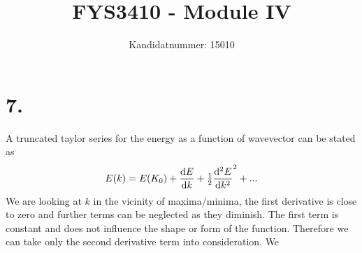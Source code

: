 \documentclass{article}
\author{Kandidatnummer: 15010}
\title{FYS3410 - Module IV}
\begin{document}
\maketitle

\section*{7. }
A truncated taylor series for the energy as a function of wavevector can be stated as
$$ E(k) = E(K_0) + \dv{E}{k} (k-k_0) + \tfrac{1}{2}\dv[2]{E}{k} (k-k_0)^2 + ...$$
We are looking at $k$ in the vicinity of maxima/minima, the first derivative is close to zero and further terms can be neglected as they diminish.
The first term is constant and does not influence the shape or form of the function.
Therefore we can take only the second derivative term into consideration.
We
\end{document}
